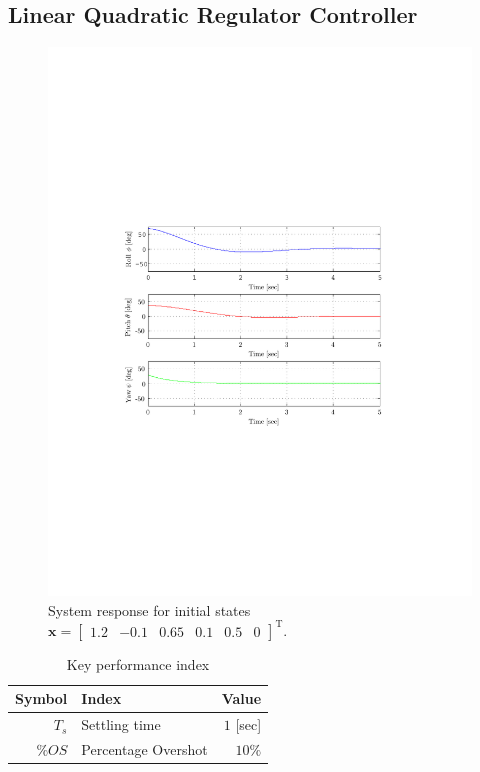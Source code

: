 \documentclass[12pt]{article}
\begin{document}
\subsection{Linear Quadratic Regulator Controller}

\begin{figure}
  \centering
  \includegraphics{lqg.pdf}
  \caption{System response for initial states $\mathbf{x} = \begin{bmatrix} 1.2 & -0.1 & 0.65 & 0.1 & 0.5 & 0 \end{bmatrix}^\mathrm{T} $.}
  \label{fig:control}
\end{figure}

\begin{table}
  \begin{center}
    \caption{Key performance index}
    \label{tab:KPI}
    \begin{tabular}{rlr}
      \hline
      Symbol & Index & Value \\
      \hline                  
      $T_s$ & Settling time & $1$ [sec]\\
      $\%OS$ & Percentage Overshot & $10\%$\\
      \hline
    \end{tabular}
  \end{center}
\end{table}
\end{document}
